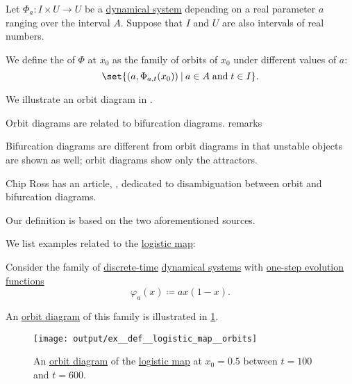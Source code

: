 \begin{definition}\label{def:orbit_diagram}\mimprovised
  Let \( \Phi_a: I \times U \to U \) be a \hyperref[def:dynamical_system]{dynamical system} depending on a real parameter \( a \) ranging over the interval \( A \). Suppose that \( I \) and \( U \) are also intervals of real numbers.

  We define the  of \( \Phi \) at \( x_0 \) as the family of orbits of \( x_0 \) under different values of \( a \):
  \begin{equation}\label{eq:def:orbit_diagram}
    \set{ (a, \Phi_{a,t}(x_0)) \given a \in A \T{and} t \in I }.
  \end{equation}
\end{definition}
\begin{comments}
  \item We illustrate an orbit diagram in .

  \item Orbit diagrams are related to bifurcation diagrams.  remarks
  \begin{displayquote}
    Bifurcation diagrams are different from orbit diagrams in that unstable objects are shown as well; orbit diagrams show only the attractors.
  \end{displayquote}

  Chip Ross has an article, \cite{Ross2004BifurcationAndOrbitDiagrams}, dedicated to disambiguation between orbit and bifurcation diagrams.

  Our definition is based on the two aforementioned sources.
\end{comments}

\begin{example}\label{ex:def:logistic_map}
  We list examples related to the \hyperref[def:logistic_map]{logistic map}:
  \begin{thmenum}
     Consider the family of \hyperref[def:discrete_dynamical_system]{discrete-time} \hyperref[def:dynamical_system]{dynamical systems} with \hyperref[def:one_step_evolution_function]{one-step evolution functions}
    \begin{equation*}
      \varphi_a(x) \coloneqq a x (1 - x).
    \end{equation*}

    An \hyperref[def:orbit_diagram]{orbit diagram} of this family is illustrated in \cref{fig:ex:def:logistic_map/orbits}.

    \begin{figure}[!ht]
      \centering
      \texttt{[image: output/ex\_\_def\_\_logistic\_map\_\_orbits]}
      \caption{An \hyperref[def:orbit_diagram]{orbit diagram} of the \hyperref[def:logistic_map]{logistic map} at \( x_0 = 0.5 \) between \( t = 100 \) and \( t = 600 \).}\label{fig:ex:def:logistic_map/orbits}
    \end{figure}
  \end{thmenum}
\end{example}

